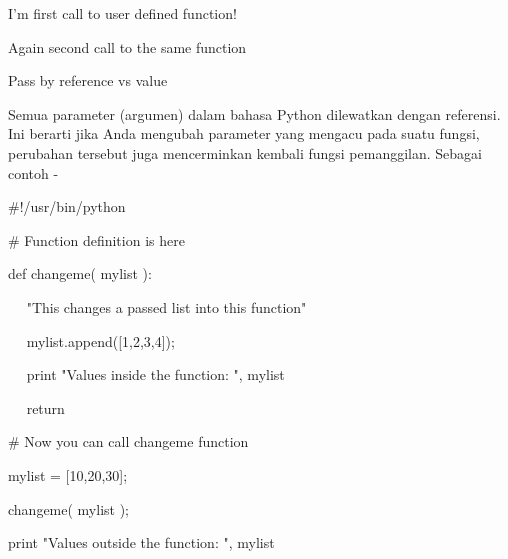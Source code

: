 \noindent 
 \hspace*{0.5in} I'm first call to user defined function! \par
\noindent 
 \hspace*{0.5in} Again second call to the same function \par
\vspace{12pt}
\vspace{\baselineskip}
\noindent 
Pass by reference vs value \par
\noindent 
Semua parameter (argumen) dalam bahasa Python dilewatkan dengan referensi. Ini berarti jika Anda mengubah parameter yang mengacu pada suatu fungsi, perubahan tersebut juga mencerminkan kembali fungsi pemanggilan. Sebagai contoh - \par
\vspace{\baselineskip}
\noindent 
 \hspace*{0.5in}  $  \#  $!/usr/bin/python \par
\vspace{12pt}
\noindent 
 \hspace*{0.5in}  $  \#  $ Function definition is here \par
\noindent 
 \hspace*{0.5in} def changeme( mylist ): \par
\noindent 
 \hspace*{0.5in} ~~ "This changes a passed list into this function" \par
\noindent 
~~  \hspace*{0.5in}mylist.append([1,2,3,4]); \par
\noindent 
~~  \hspace*{0.5in} print "Values inside the function: ", mylist \par
\noindent 
~~  \hspace*{0.5in} return \par
\noindent 
 \hspace*{0.5in} \vspace{12pt}
 \vspace{\baselineskip}
\noindent 
 \hspace*{0.5in}  $  \#  $ Now you can call changeme function \par
\noindent 
 \hspace*{0.5in} mylist = [10,20,30]; \par
\noindent 
 \hspace*{0.5in} changeme( mylist ); \par
\noindent 
 \hspace*{0.5in} print "Values outside the function: ", mylist \par
